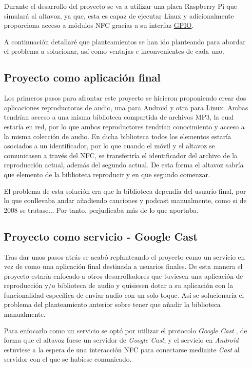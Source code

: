Durante el desarrollo del proyecto se va a utilizar una placa Raspberry Pi que
simulará al altavoz, ya que, esta es capaz de ejecutar Linux y adicionalmente
proporciona acceso a módulos NFC gracias a su interfaz
\href{https://es.wikipedia.org/wiki/GPIO}{GPIO}.


A continuación detallaré que planteamientos se han ido planteando para abordar el
problema a solucionar, así como ventajas e inconvenientes de cada uno.

\subsection{Proyecto como aplicación final}

Los primeros pasos para afrontar este proyecto se hicieron proponiendo crear dos
aplicaciones reproductoras de audio, una para Android y otra para Linux. Ambas
tendrían acceso a una misma biblioteca compartida de archivos MP3, la cual
estaría en red, por lo que ambos reproductores tendrían conocimiento y acceso a
la misma colección de audio. En dicha biblioteca todos los elementos estaría
asociados a un identificador, por lo que cuando el móvil y el altavoz se
comunicasen a través del NFC, se transferiría el identificador del archivo de la
reproducción actual, además del segundo actual. De esta forma el altavoz sabría
que elemento de la biblioteca reproducir y en que segundo comenzar.

El problema de esta solución era que la biblioteca dependía del usuario final,
por lo que conllevaba andar añadiendo canciones y podcast manualmente, como si
de 2008 se tratase... Por tanto, perjudicaba más de lo que aportaba.

\subsection{Proyecto como servicio - Google Cast}

Tras dar unos pasos atrás se acabó replanteando el proyecto como un servicio en
vez de como una aplicación final destinada a usuarios finales. De esta manera el
proyecto estaría enfocado a otros desarrolladores que tuviesen una aplicación de
reproducción y/o biblioteca de audio y quisiesen dotar a su aplicación con la
funcionalidad específica de enviar audio con un solo toque. Así se
solucionaría el problema del planteamiento anterior sobre tener que añadir la
biblioteca manualmente.

Para enfocarlo como un servicio se optó por utilizar el protocolo \emph{Google
Cast} \cite{google-cast}, de forma que el altavoz fuese
un servidor de \emph{Google Cast}, y el servicio en \emph{Android} estuviese a
la espera de una interacción NFC para conectarse mediante \emph{Cast} al
servidor con el que se hubiese comunicado. 

